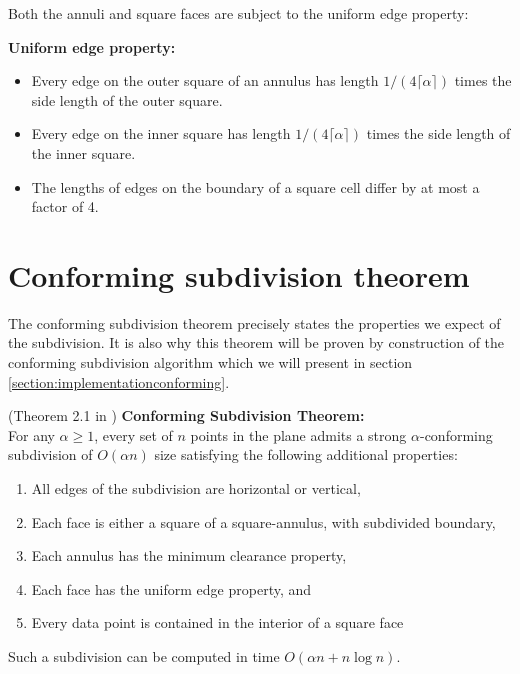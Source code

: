 Both the annuli and square faces are subject to the uniform edge property:

\begin{mydef} \textbf{Uniform edge property:} 
\begin{itemize}
	\itemsep0em 
	\item Every edge on the outer square of an annulus has length
		  $1/(4\lceil \alpha \rceil)$ times the side length of the outer square.
	\item Every edge on the inner square has length $1/(4\lceil\alpha\rceil)$ times
		  the side length of the inner square.
	\item The lengths of edges on the boundary of a square cell differ by at
		  most a factor of 4.
\end{itemize}
\end{mydef}

\section{Conforming subdivision theorem}

The conforming subdivision theorem precisely states the properties we expect of the 
subdivision. It is also why this theorem will be proven by construction of the 
conforming subdivision algorithm which we will present in section 
\ref{section:implementationconforming}.

\begin{theorem}
	\label{theorem:conformingsubdivision}
	(Theorem 2.1 in \cite{HershbergerS99}) \textbf{Conforming Subdivision Theorem:} \\
	For any $\alpha\geq 1$, every set of $n$ points in the plane admits a strong
	$\alpha$-conforming subdivision of $O(\alpha n)$ size satisfying the
	following additional properties:
\begin{enumerate}	
	\item All edges of the subdivision are horizontal or vertical,
	\item Each face is either a square of a square-annulus, with subdivided
		boundary,
	\item Each annulus has the minimum clearance property,
	\item Each face has the uniform edge property, and
	\item Every data point is contained in the interior of a square face
\end{enumerate}
	Such a subdivision can be computed in time $O(\alpha n + n\log n)$.
\end{theorem}

